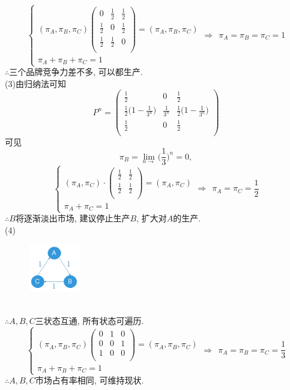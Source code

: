 \[
\begin{cases}
(\pi_A,\pi_B,\pi_C)
\begin{pmatrix}
0 & \frac{1}{2} & \frac{1}{2}\\
\frac{1}{2} & 0 & \frac{1}{2}\\
\frac{1}{2} & \frac{1}{2} & 0\\
\end{pmatrix}
=
(\pi_A,\pi_B,\pi_C)\\
\pi_A+\pi_B+\pi_C = 1
\end{cases}
\Rightarrow~~
\pi_A = \pi_B = \pi_C = 1
\]
$\therefore$三个品牌竞争力差不多, 可以都生产.\\
(3)由归纳法可知
\[
P^n=
\begin{pmatrix}
\frac{1}{2} & 0 & \frac{1}{2}\\
\frac{1}{2}\big(1-\frac{1}{3^n}\big) & \frac{1}{3^n} & \frac{1}{2}\big(1-\frac{1}{3^n}\big)\\
\frac{1}{2} & 0 & \frac{1}{2}\\
\end{pmatrix}
\]
可见
\[
\pi_B = \lim_{n\rightarrow} \Big(\frac{1}{3}\Big)^n = 0,
\]
\[
\begin{cases}
(\pi_A, \pi_C)\cdot
	\begin{pmatrix}
	\frac{1}{2} & \frac{1}{2}\\
	\frac{1}{2} & \frac{1}{2}\\
	\end{pmatrix}
=
(\pi_A, \pi_C)\\
\pi_A + \pi_C = 1
\end{cases}
\Rightarrow~~
\pi_A = \pi_C = \frac{1}{2}
\]
$\therefore B$将逐渐淡出市场, 建议停止生产$B$, 扩大对$A$的生产.\\
(4)
\begin{figure}[htbp]
		\centering
		\includegraphics[width=0.2\textwidth]{resource/sp3_14_4.png}
\end{figure}\\
$\therefore A,B,C$三状态互通, 所有状态可遍历.\\
\[
\begin{cases}
(\pi_A,\pi_B,\pi_C)
\begin{pmatrix}
0 & 1 & 0\\
0 & 0 & 1\\
1 & 0 & 0\\
\end{pmatrix}
=
(\pi_A,\pi_B,\pi_C)\\
\pi_A+\pi_B+\pi_C = 1
\end{cases}
\Rightarrow~~
\pi_A = \pi_B = \pi_C = \frac{1}{3}
\]
$\therefore A,B,C$市场占有率相同, 可维持现状.\\


